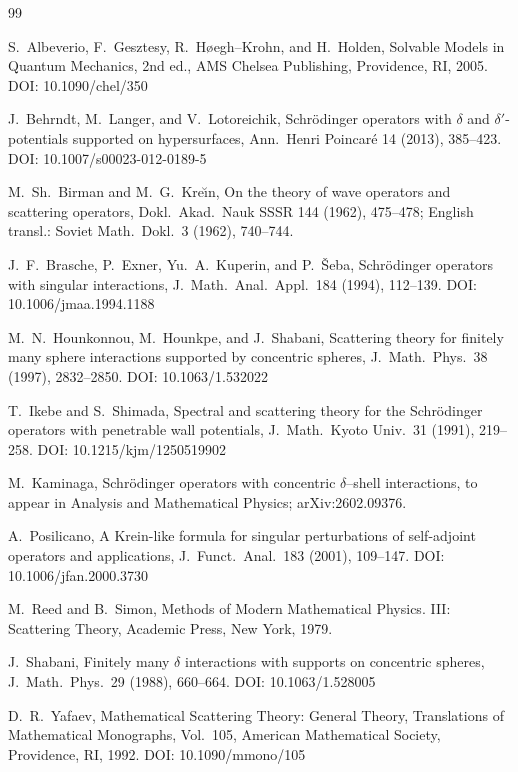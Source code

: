 \documentclass[a4paper,11pt]{article}
\numberwithin{equation}{section}
\theoremstyle{definition}
\theoremstyle{remark}
\begin{document}
\small
\begin{thebibliography}{99}

S.~Albeverio, F.~Gesztesy, R.~H{\o}egh--Krohn, and H.~Holden,
Solvable Models in Quantum Mechanics,
2nd ed.,
AMS Chelsea Publishing,
Providence, RI, 2005.
DOI: 10.1090/chel/350

J.~Behrndt, M.~Langer, and V.~Lotoreichik,
Schr\"odinger operators with $\delta$ and $\delta'$-potentials supported on hypersurfaces,
Ann.\ Henri Poincar\'e 14 (2013), 385--423.
DOI: 10.1007/s00023-012-0189-5

M.~Sh.~Birman and M.~G.~Kre\u{\i}n,
On the theory of wave operators and scattering operators,
Dokl.\ Akad.\ Nauk SSSR 144 (1962), 475--478;
English transl.: Soviet Math.\ Dokl.\ 3 (1962), 740--744.

J.~F.~Brasche, P.~Exner, Yu.~A.~Kuperin, and P.~{\v S}eba,
Schr\"odinger operators with singular interactions,
J.\ Math.\ Anal.\ Appl.\ 184 (1994), 112--139.
DOI: 10.1006/jmaa.1994.1188

M.~N.~Hounkonnou, M.~Hounkpe, and J.~Shabani,
Scattering theory for finitely many sphere interactions supported by concentric spheres,
J.\ Math.\ Phys.\ 38 (1997), 2832--2850.
DOI: 10.1063/1.532022

T.~Ikebe and S.~Shimada,
Spectral and scattering theory for the Schr\"odinger operators with
penetrable wall potentials,
J.\ Math.\ Kyoto Univ.\ 31 (1991), 219--258.
DOI: 10.1215/kjm/1250519902

M.~Kaminaga,
Schr\"odinger operators with concentric $\delta$--shell interactions,
to appear in Analysis and Mathematical Physics; arXiv:2602.09376.

A.~Posilicano,
A Krein-like formula for singular perturbations of self-adjoint operators and applications,
J.\ Funct.\ Anal.\ 183 (2001), 109--147.
DOI: 10.1006/jfan.2000.3730

M.~Reed and B.~Simon,
Methods of Modern Mathematical Physics. III: Scattering Theory,
Academic Press,
New York, 1979.

J.~Shabani,
Finitely many $\delta$ interactions with supports on concentric spheres,
J.\ Math.\ Phys.\ 29 (1988), 660--664.
DOI: 10.1063/1.528005

D.~R.~Yafaev,
Mathematical Scattering Theory: General Theory,
Translations of Mathematical Monographs, Vol.~105,
American Mathematical Society,
Providence, RI, 1992.
DOI: 10.1090/mmono/105

\end{thebibliography}
\end{document}
